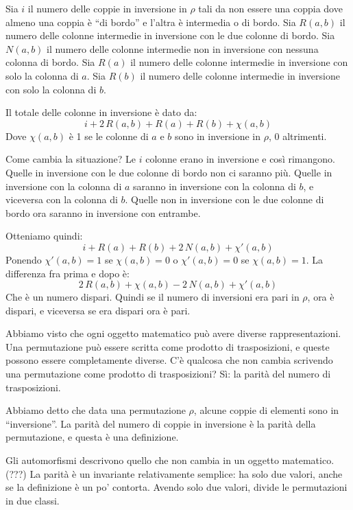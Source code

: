 	Sia $i$ il numero delle coppie in inversione in $\rho$ tali da non essere una coppia dove almeno una coppia \`e ``di bordo'' e l'altra \`e intermedia o di bordo.
	Sia $R(a,b)$ il numero delle colonne intermedie in inversione con le due colonne di bordo.
	Sia $N(a,b)$ il numero delle colonne intermedie non in inversione con nessuna colonna di bordo.
	Sia $R(a)$ il numero delle colonne intermedie in inversione con solo la colonna di $a$.
	Sia $R(b)$ il numero delle colonne intermedie in inversione con solo la colonna di $b$.

	Il totale delle colonne in inversione \`e dato da:
	\[
		i + 2 \, R(a,b) + R(a) + R(b) + \chi (a,b)
	\]
	Dove $\chi (a,b)$ \`e 1 se le colonne di $a$ e $b$ sono in inversione in $\rho$, 0 altrimenti.

	Come cambia la situazione?
	Le $i$ colonne erano in inversione e cos\`i rimangono. Quelle in inversione con le due colonne di bordo non ci saranno pi\`u.
	Quelle in inversione con la colonna di $a$ saranno in inversione con la colonna di $b$, e viceversa con la colonna di $b$.
	Quelle non in inversione con le due colonne di bordo ora saranno in inversione con entrambe.

	Otteniamo quindi:
	\[
		i + R(a) + R(b) + 2 \, N(a,b) + \chi'(a,b)
	\]
	Ponendo $\chi'(a,b) = 1$ se $\chi (a,b) = 0$ o $\chi'(a,b) = 0$ se $\chi(a,b) = 1$.
	La differenza fra prima e dopo \`e:
	\[
		2 \, R(a,b) + \chi (a,b) - 2 \, N(a,b) + \chi'(a,b)
	\]
	Che \`e un numero dispari.
	Quindi se il numero di inversioni era pari in $\rho$, ora \`e dispari, e viceversa se era dispari ora \`e pari.

	Abbiamo visto che ogni oggetto matematico pu\`o avere diverse rappresentazioni.
	Una permutazione pu\`o essere scritta come prodotto di trasposizioni, e queste possono essere completamente diverse.
	C'\`e qualcosa che non cambia scrivendo una permutazione come prodotto di trasposizioni?
	S\`i: la parit\`a del numero di trasposizioni.

	Abbiamo detto che data una permutazione $\rho$, alcune coppie di elementi sono in ``inversione''.
	La parit\`a del numero di coppie in inversione \`e la parit\`a della permutazione, e questa \`e una definizione.

	Gli automorfismi descrivono quello che non cambia in un oggetto matematico. (???)
	La parit\`a \`e un invariante relativamente semplice: ha solo due valori, anche se la definizione \`e un po' contorta.
	Avendo solo due valori, divide le permutazioni in due classi.


